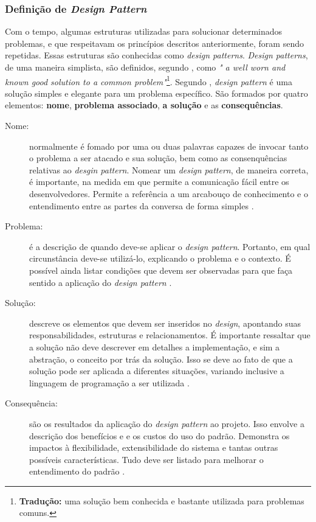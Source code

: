 \subsubsection{Definição de \textit{Design Pattern}}
Com o tempo, algumas estruturas utilizadas para solucionar determinados problemas,
e que respeitavam os princípios descritos anteriormente, foram sendo repetidas.
Essas estruturas são conhecidas como  \textit{design patterns}. \textit{Design patterns},
de uma maneira simplista, são definidos, segundo , como
\textit{" a well worn and known good solution to a common problem"}\footnote{\textbf{Tradução:} uma solução bem conhecida e bastante utilizada para problemas comuns.}. Segundo
, \textit{design pattern} é uma solução simples e
elegante para um problema específico. São formados por quatro elementos: \textbf{nome},
\textbf{problema associado}, \textbf{a solução} e as \textbf{consequências}.
\begin{description}
\item[Nome:] normalmente é fomado por uma ou duas palavras capazes de invocar
tanto o problema a ser atacado e sua solução, bem como as consenquências relativas
ao \textit{desgin pattern}. Nomear um \textit{design pattern}, de maneira correta,
é importante, na medida em que permite a comunicação fácil entre os desenvolvedores.
Permite a referência a um arcabouço de conhecimento e o entendimento entre as
partes da conversa de forma simples \cite{martin2000}.
\item[Problema:] é a descrição de quando deve-se aplicar o \textit{design pattern}.
Portanto, em qual circunstância deve-se utilizá-lo, explicando o problema e o contexto.
É possível ainda listar condições que devem ser observadas para que faça sentido a
aplicação do \textit{design pattern} \cite{martin2000}.
\item[Solução:] descreve os elementos que devem ser inseridos no \textit{design},
apontando suas responsabilidades, estruturas e relacionamentos. É importante
ressaltar que a solução não deve descrever em detalhes a implementação, e sim a
abstração, o conceito por trás da solução. Isso se deve ao fato de que a solução
pode ser aplicada a diferentes situações, variando inclusive a linguagem de
programação a ser utilizada \cite{martin2000}.
\item[Consequência:] são os resultados da aplicação do \textit{design pattern}
ao projeto. Isso envolve a descrição dos benefícios e e os custos do uso do padrão.
Demonstra os impactos à flexibilidade, extensibilidade do sistema e tantas outras
possíveis características. Tudo deve ser listado para melhorar o entendimento do
padrão \cite{martin2000}.
\end{description}
\par
